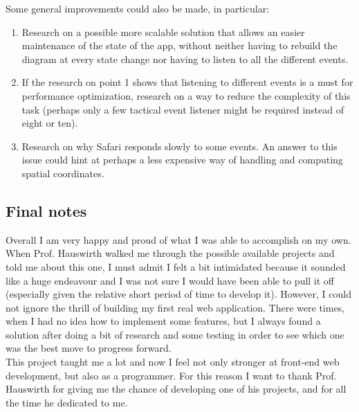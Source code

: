 \documentclass[]{usiinfbachelorproject}
\begin{document}
\noindent Some general improvements could also be made, in particular:

\begin{enumerate}
	\item Research on a possible more scalable solution that allows an easier maintenance of the state of the app, without neither having to rebuild the diagram at every state change nor having to listen to all the different events.
	\item If the research on point 1 shows that listening to different events is a must for performance optimization, research on a way to reduce the complexity of this task (perhaps only a few tactical event listener might be required instead of eight or ten).
	\item Research on why Safari responds slowly to some events. An answer to this issue could hint at perhaps a less expensive way of handling and computing spatial coordinates.
\end{enumerate}

\subsection{Final notes}

Overall I am very happy and proud of what I was able to accomplish on my own. When Prof. Hauswirth walked me through the possible available projects and told me about this one, I must admit I felt a bit intimidated because it sounded like a huge endeavour and I was not sure I would have been able to pull it off (especially given the relative short period of time to develop it). However, I could not ignore the thrill of building my first real web application. There were times, when I had no idea how to implement some features, but I always found a solution after doing a bit of research and some testing in order to see which one was the best move to progress forward.\\
This project taught me a lot and now I feel not only stronger at front-end web development, but also as a programmer. For this reason I want to thank Prof. Hauswirth for giving me the chance of developing one of his projects, and for all the time he dedicated to me.

\vspace{\fill}

\pagebreak



\end{document}
